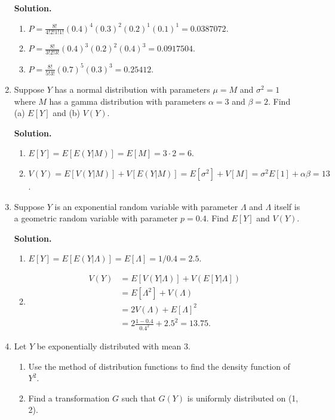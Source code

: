 \documentclass[9pt]{article}
\newcommand{\D}{\displaystyle}
\begin{document}
\begin{enumerate}
      \textbf{Solution.}
      
      \begin{enumerate}
         \item $P = \D\frac{8!}{4!2!1!1!}(0.4)^4(0.3)^2(0.2)^1
               (0.1)^1 = 0.0387072$.
         \item $P = \D\frac{8!}{3!2!3!}(0.4)^3(0.2)^2(0.4)^3 = 0.0917504$.
         \item $P = \D\frac{8!}{5!3!}(0.7)^5(0.3)^3 = 0.25412$.
      \end{enumerate}
   \item Suppose $Y$ has a normal distribution with parameters $\mu = M$ and
         $\sigma^2 = 1$ where $M$ has a gamma distribution with parameters
         $\alpha = 3$ and $\beta = 2$. Find (a) $E[Y]$ and (b) $V(Y)$.

      \textbf{Solution.}
      
      \begin{enumerate}
         \item $E[Y] = E[E(Y | M)] = E[M] = 3 \cdot 2 = 6$.
         \item $V(Y) = E[V(Y|M)] + V[E(Y|M)] = E[\sigma^2] + V[M] =
                \sigma^2E[1] + \alpha\beta = 13$.
      \end{enumerate}
   \item Suppose $Y$ is an exponential random variable with parameter $\Lambda$
         and $\Lambda$ itself is a geometric random variable with parameter
         $p = 0.4$. Find $E[Y]$ and $V(Y)$.

      \textbf{Solution.}
      
      \begin{enumerate}
         \item $E[Y] = E[E(Y | \Lambda)] = E[\Lambda] = 1 / 0.4 = 2.5$.
         \item \begin{align*}
                  V(Y) &= E[V(Y|\Lambda)] + V(E[Y|\Lambda]) \\
                       &= E[\Lambda^2] + V(\Lambda)    \\
                       &= 2V(\Lambda) + E[\Lambda]^2 \\
                       &= 2\frac{1 - 0.4}{0.4^2} + 2.5^2 = 13.75.
               \end{align*}
      \end{enumerate}
   \item Let $Y$ be exponentially distributed with mean 3.
         \begin{enumerate}
            \item Use the method of distribution functions to find the density
                  function of $Y^2$.
            \item Find a transformation $G$ such that $G(Y)$ is uniformly
                  distributed on (1, 2).
         \end{enumerate}


\end{enumerate}
\end{document}
